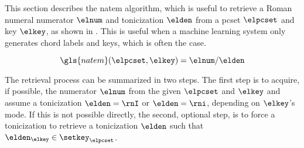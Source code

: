 
This section describes the \gls{natem} algorithm, which is
useful to retrieve a Roman numeral numerator $\elnum$ and
tonicization $\elden$ from a \gls{pcset} $\elpcset$ and key
$\elkey$, as shown in . This is useful when a
machine learning system only generates chord labels and
keys, which is often the case. 

\begin{equation}
    \label{eq:natem}
    \gls{natem}(\elpcset, \elkey) = \elnum\text{/}\elden
\end{equation}

The retrieval process can be summarized in two steps. The
first step is to acquire, if possible, the numerator
$\elnum$ from the given $\elpcset$ and $\elkey$ and assume a
tonicization $\elden = \rnI$ or $\elden = \rni$, depending
on $\elkey$'s mode. If this is not possible directly, the
second, optional step, is to force a tonicization to
retrieve a tonicization $\elden$ such that $\elden_\elkey
\in \setkey_\elpcset$.

